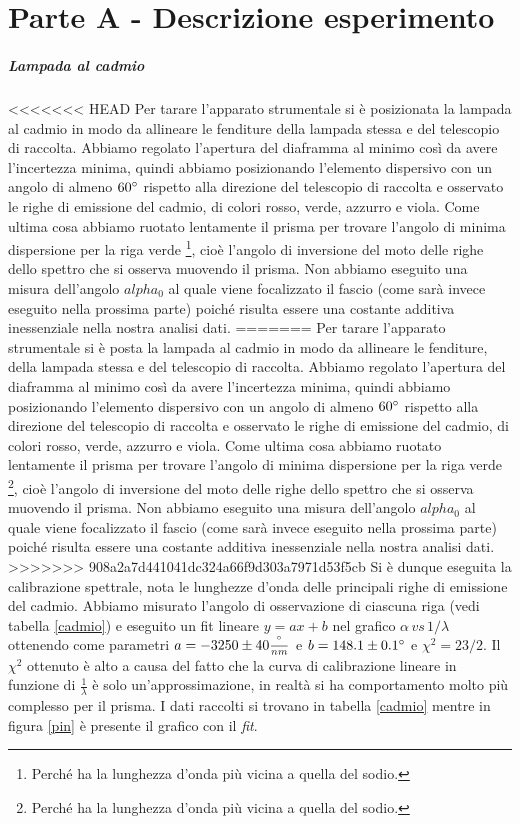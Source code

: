 \documentclass[10pt,a4paper]{article}
\begin{document}
\section{Parte A - Descrizione esperimento}
\subparagraph{Lampada al cadmio}
<<<<<<< HEAD
Per tarare l'apparato strumentale si è posizionata la lampada al cadmio in modo da allineare le fenditure della lampada stessa e del telescopio di raccolta. Abbiamo regolato l'apertura del diaframma al minimo così da avere l'incertezza minima, quindi abbiamo posizionando l'elemento dispersivo con un angolo di almeno $60\degree$ rispetto alla direzione del telescopio di raccolta e osservato le righe di emissione del cadmio, di colori rosso, verde, azzurro e viola. Come ultima cosa abbiamo ruotato lentamente il prisma per trovare l'angolo di minima dispersione per la riga verde \footnote{Perché ha la lunghezza d'onda più vicina a quella del sodio.}, cioè l'angolo di inversione del moto delle righe dello spettro che si osserva muovendo il prisma. Non abbiamo eseguito una misura dell'angolo $alpha_0$ al quale viene focalizzato il fascio (come sarà invece eseguito nella prossima parte) poiché risulta essere una costante additiva inessenziale nella nostra analisi dati.
=======
Per tarare l'apparato strumentale si è posta la lampada al cadmio in modo da allineare le fenditure, della lampada stessa e del telescopio di raccolta. Abbiamo regolato l'apertura del diaframma al minimo così da avere l'incertezza minima, quindi abbiamo posizionando l'elemento dispersivo con un angolo di almeno $60\degree$ rispetto alla direzione del telescopio di raccolta e osservato le righe di emissione del cadmio, di colori rosso, verde, azzurro e viola. Come ultima cosa abbiamo ruotato lentamente il prisma per trovare l'angolo di minima dispersione per la riga verde \footnote{Perché ha la lunghezza d'onda più vicina a quella del sodio.}, cioè l'angolo di inversione del moto delle righe dello spettro che si osserva muovendo il prisma. Non abbiamo eseguito una misura dell'angolo $alpha_0$ al quale viene focalizzato il fascio (come sarà invece eseguito nella prossima parte) poiché risulta essere una costante additiva inessenziale nella nostra analisi dati.
>>>>>>> 908a2a7d441041dc324a66f9d303a7971d53f5cb
Si è dunque eseguita la calibrazione spettrale, nota le lunghezze d'onda delle principali righe di emissione del cadmio. Abbiamo misurato l'angolo di osservazione di ciascuna riga (vedi tabella \ref{cadmio}) e eseguito un fit lineare $y=ax+b$ nel grafico $\alpha\, \textit{vs}\, 1/\lambda$ ottenendo come parametri $a = -3250 \pm 40 \frac{\degree}{nm}$ e $ b = 148.1 \pm 0.1 \degree$ e $\chi^2=23/2$. Il $\chi^2$ ottenuto è alto a causa del fatto che la curva di calibrazione lineare in funzione di $\frac{1}{\lambda}$ è solo un'approssimazione, in realtà si ha comportamento molto più complesso per il prisma. I dati raccolti si trovano in tabella \ref{cadmio} mentre in figura \ref{pin} è presente il grafico con il \emph{fit}.
\end{document}
